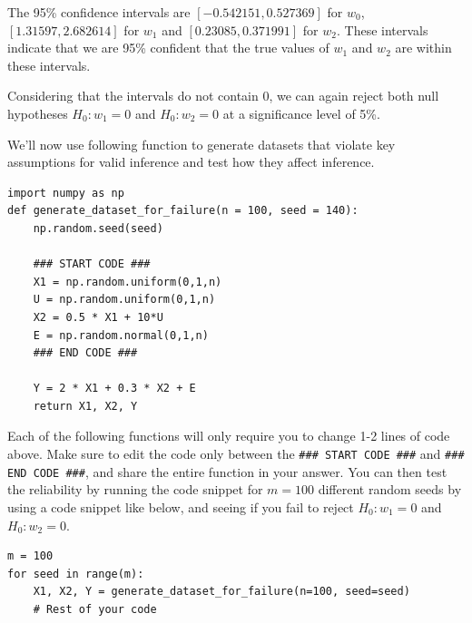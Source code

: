 \documentclass{article}
\begin{document}
\begin{probset}
\begin{prob} 
\begin{subprobset}
\begin{subprob}
\begin{soln}
                The 95\% confidence intervals are $[-0.542151, 0.527369]$ for $w_0$, $[ 1.31597, 2.682614]$ for $w_1$ and $[ 0.23085, 0.371991]$ for $w_2$. These intervals indicate that we are 95\% confident that the true values of $w_1$ and $w_2$ are within these intervals.

                Considering that the intervals do not contain 0, we can again reject both null hypotheses $H_0 : w_1 = 0$ and $H_0 : w_2 = 0$ at a significance level of 5\%.
            \end{soln}
        \end{subprob}

        \newpage

        \begin{subprob}
            We'll now use following function to generate datasets that violate key assumptions for valid inference and test how they affect inference.

            \begin{lstlisting}
import numpy as np
def generate_dataset_for_failure(n = 100, seed = 140):
    np.random.seed(seed)

    ### START CODE ###
    X1 = np.random.uniform(0,1,n)
    U = np.random.uniform(0,1,n)
    X2 = 0.5 * X1 + 10*U
    E = np.random.normal(0,1,n)
    ### END CODE ###

    Y = 2 * X1 + 0.3 * X2 + E
    return X1, X2, Y
            \end{lstlisting}

            Each of the following functions will only require you to change 1-2 lines of code above. Make sure to edit the code only between the \texttt{\#\#\# START CODE \#\#\#} and \texttt{\#\#\# END CODE \#\#\#}, and share the entire function in your answer. You can then test the reliability by running the code snippet for $m = 100$ different random seeds by using a code snippet like below, and seeing if you fail to reject $H_0 : w_1 = 0$ and $H_0 : w_2 = 0$.

            \begin{lstlisting}
m = 100
for seed in range(m):
    X1, X2, Y = generate_dataset_for_failure(n=100, seed=seed)
    # Rest of your code
            \end{lstlisting}


\end{subprob}
\end{subprobset}
\end{prob}
\end{probset}
\end{document}
